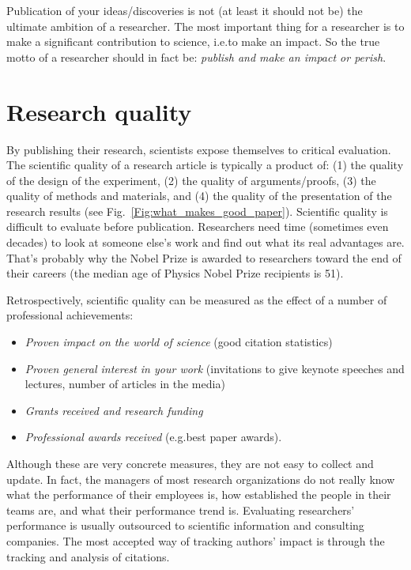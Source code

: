 \documentclass[graybox,envcountchap,sectrefs,UStrade]{svmono}
\begin{document}
Publication of your ideas/discoveries is not (at least it should not be) the ultimate ambition of a researcher. The most important thing for a researcher is to make a significant contribution to science, i.e.\@ to make an impact. So the true motto of a researcher should in fact be: \emph{publish and make an impact or perish}.\par


\section{Research quality}

By publishing their research, scientists expose themselves to critical evaluation. The scientific quality of a research article is typically a product of: (1) the quality of the design of the experiment, (2) the quality of arguments/proofs, (3) the quality of methods and materials, and (4) the quality of the presentation of the research results (see Fig.\@~\ref{Fig:what_makes_good_paper}). Scientific quality is difficult to evaluate before publication. Researchers need time (sometimes even decades) to look at someone else's work and find out what its real advantages are. That's probably why the Nobel Prize is awarded to researchers toward the end of their careers (the median age of Physics Nobel Prize recipients is 51).\par

Retrospectively, scientific quality can be measured as the effect of a number of professional achievements:

\begin{itemize}
  \item \emph{Proven impact on the world of science} (good citation statistics)
  \item \emph{Proven general interest in your work} (invitations to give keynote speeches and lectures, number of articles in the media)
  \item \emph{Grants received and research funding}
  \item \emph{Professional awards received} (e.g.\@ best paper awards).
\end{itemize}

Although these are very concrete measures, they are not easy to collect and update. In fact, the managers of most research organizations do not really know what the performance of their employees is, how established the people in their teams are, and what their performance trend is. Evaluating researchers' performance is usually outsourced to scientific information and consulting companies. The most accepted way of tracking authors' impact is through the tracking and analysis of citations.\par
\end{document}
